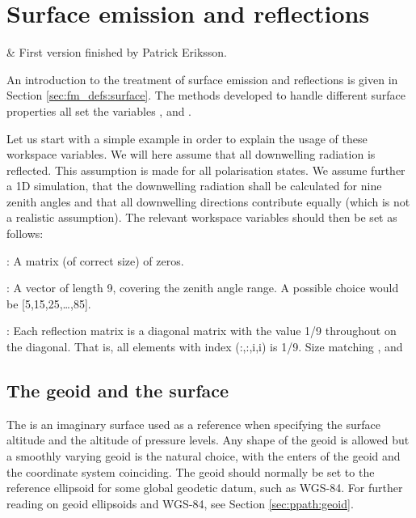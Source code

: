 \chapter{Surface emission and reflections}
 \label{sec:surface}


 & First version finished by Patrick Eriksson. \\
\stophistory

An introduction to the treatment of surface emission and reflections
is given in Section \ref{sec:fm_defs:surface}. The methods developed
to handle different surface properties all set the variables
,  and
.

Let us start with a simple example in
order to explain the usage of these workspace variables. We will here
assume that all downwelling radiation is reflected. This assumption is
made for all polarisation states. We assume further a 1D simulation,
that the downwelling radiation shall be calculated for nine zenith
angles and that all downwelling directions contribute equally (which
is not a realistic assumption). The relevant workspace
variables should then be set as follows:
 
 : A matrix (of correct size) of zeros.

 : A vector of length 9, covering the zenith
 angle range. A possible choice would be [5,15,25,\dots,85].

 : Each reflection matrix is a diagonal
 matrix with the value 1/9 throughout on the diagonal. That is, all
 elements with index (:,:,i,i) is 1/9. Size matching
 ,  and


\section{The geoid and the surface}
\label{sec:fm_defs:geoid}

The  is an imaginary surface used as a
reference when specifying the surface altitude and the altitude
of pressure levels. Any shape of the geoid is allowed but a smoothly
varying geoid is the natural choice, with the enters of the geoid and
the coordinate system coinciding. The geoid should normally be set to
the reference ellipsoid for some global geodetic datum, such as
WGS-84. For further reading on geoid ellipsoids and WGS-84, see
Section \ref{sec:ppath:geoid}.

